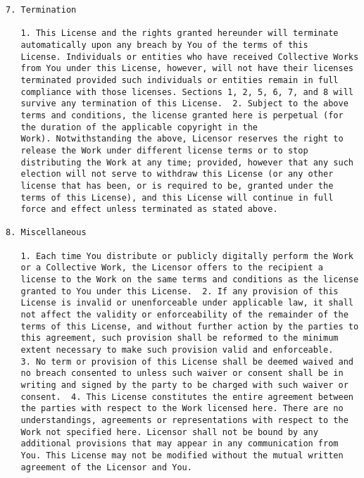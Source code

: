 \begin{lstlisting}
7. Termination

   1. This License and the rights granted hereunder will terminate
   automatically upon any breach by You of the terms of this
   License. Individuals or entities who have received Collective Works
   from You under this License, however, will not have their licenses
   terminated provided such individuals or entities remain in full
   compliance with those licenses. Sections 1, 2, 5, 6, 7, and 8 will
   survive any termination of this License.  2. Subject to the above
   terms and conditions, the license granted here is perpetual (for
   the duration of the applicable copyright in the
   Work). Notwithstanding the above, Licensor reserves the right to
   release the Work under different license terms or to stop
   distributing the Work at any time; provided, however that any such
   election will not serve to withdraw this License (or any other
   license that has been, or is required to be, granted under the
   terms of this License), and this License will continue in full
   force and effect unless terminated as stated above.

8. Miscellaneous

   1. Each time You distribute or publicly digitally perform the Work
   or a Collective Work, the Licensor offers to the recipient a
   license to the Work on the same terms and conditions as the license
   granted to You under this License.  2. If any provision of this
   License is invalid or unenforceable under applicable law, it shall
   not affect the validity or enforceability of the remainder of the
   terms of this License, and without further action by the parties to
   this agreement, such provision shall be reformed to the minimum
   extent necessary to make such provision valid and enforceable.
   3. No term or provision of this License shall be deemed waived and
   no breach consented to unless such waiver or consent shall be in
   writing and signed by the party to be charged with such waiver or
   consent.  4. This License constitutes the entire agreement between
   the parties with respect to the Work licensed here. There are no
   understandings, agreements or representations with respect to the
   Work not specified here. Licensor shall not be bound by any
   additional provisions that may appear in any communication from
   You. This License may not be modified without the mutual written
   agreement of the Licensor and You.

\end{lstlisting}

